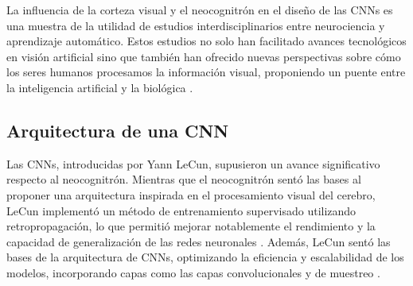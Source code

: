 La influencia de la corteza visual y el neocognitrón en el diseño de las CNNs es una muestra de la utilidad de estudios interdisciplinarios entre neurociencia y aprendizaje automático. Estos estudios no solo han facilitado avances tecnológicos en visión artificial sino que también han ofrecido nuevas perspectivas sobre cómo los seres humanos procesamos la información visual, proponiendo un puente entre la inteligencia artificial y la biológica \cite{serre2007feedforward}.


\subsection{Arquitectura de una CNN}

Las CNNs, introducidas por Yann LeCun, supusieron un avance significativo respecto al neocognitrón. Mientras que el neocognitrón sentó las bases al proponer una arquitectura inspirada en el procesamiento visual del cerebro, LeCun implementó un método de entrenamiento supervisado utilizando retropropagación, lo que permitió mejorar notablemente el rendimiento y la capacidad de generalización de las redes neuronales \cite{lecun1998gradient}. Además, LeCun sentó las bases de la arquitectura de CNNs, optimizando la eficiencia y escalabilidad de los modelos, incorporando capas como las capas convolucionales y de muestreo \cite{lecun1989backpropagation}.

